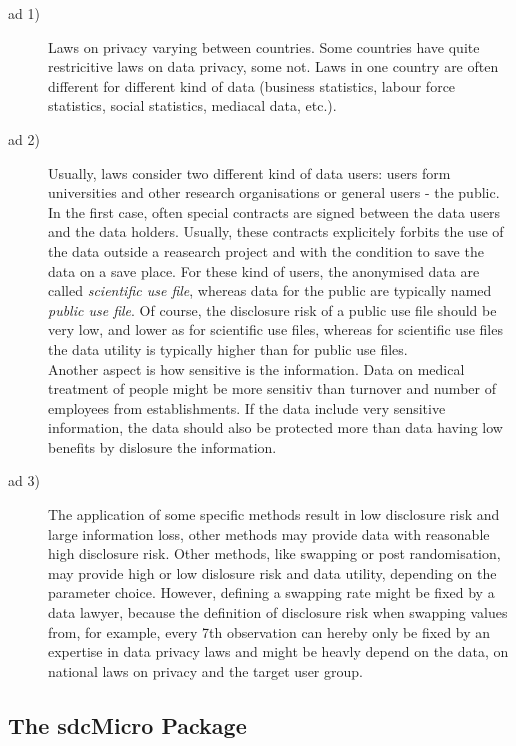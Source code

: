 \documentclass[12pt]{article}
\begin{document}
\begin{description}
\item[ad 1)] Laws on privacy varying between countries. Some countries have quite restricitive laws
on data privacy, some not. Laws in one country are often different for different kind of data (business
statistics, labour force statistics, social statistics, mediacal data, etc.).
\item[ad 2)] Usually, laws consider two different kind of data users: users form universities and other 
research organisations or general users - the public. In the first case, often special contracts are signed
between the data users and the data holders. Usually, these contracts explicitely forbits the use of the data
outside a reasearch project and with the condition to save the data on a save place. 
For these kind of users, the anonymised data are called \textit{scientific use file}, whereas data
for the public are typically named \textit{public use file}. Of course, the disclosure risk of 
a public use file should be very low, and lower as for scientific use files, whereas for scientific use
files the data utility is typically higher than for public use files. \\
Another aspect is how sensitive is the information. Data on medical treatment of people might be more
sensitiv than turnover and number of employees from establishments. If the data include very sensitive
information, the data should also be protected more than data having low benefits by dislosure the
information.
\item[ad 3)] The application of some specific methods result in low disclosure risk and 
large information loss, other methods may provide data with reasonable high disclosure risk. Other methods, like
swapping or post randomisation, may provide high or low dislosure risk and data utility, depending
on the parameter choice. However, defining a swapping rate might be fixed by a data lawyer, because
the definition of disclosure risk when swapping values from, for example, every 7th observation can hereby
only be fixed by an expertise in data privacy laws and might be heavly depend on the data, on
national laws on privacy and the target user group. 
\end{description}



\subsection{The sdcMicro Package}
\end{document}
